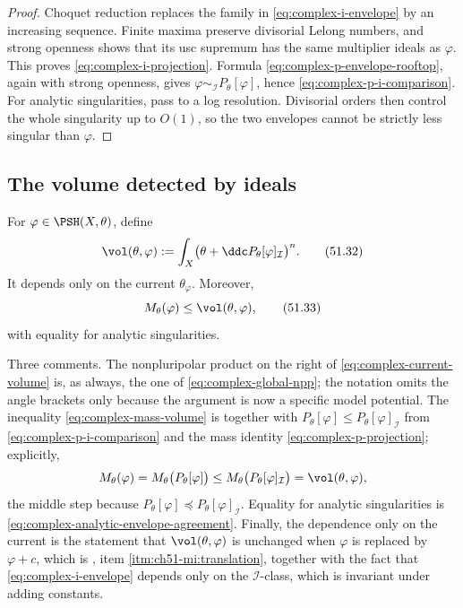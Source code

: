 \begin{proof}
Choquet reduction replaces the family in
\eqref{eq:complex-i-envelope} by an increasing sequence.  Finite maxima
preserve divisorial Lelong numbers, and strong openness shows that its
usc supremum has the same multiplier ideals as \(\varphi\).  This proves
\eqref{eq:complex-i-projection}.  Formula
\eqref{eq:complex-p-envelope-rooftop}, again with strong openness, gives
\(\varphi\sim_{\mathcal I}P_\theta[\varphi]\), hence
\eqref{eq:complex-p-i-comparison}.  For analytic singularities, pass to
a log resolution.  Divisorial orders then control the whole singularity
up to \(O(1)\), so the two envelopes cannot be strictly less singular
than \(\varphi\).
\end{proof}

\subsection{The volume detected by ideals}
\label{sec:ch51-current-volume}

\begin{definition}
\label{def:complex-current-volume}
For \(\varphi\in\PSH(X,\theta)\), define
\[
 \vol(\theta,\varphi)
 :=\int_X\bigl(\theta+\ddc
             P_\theta[\varphi]_{\mathcal I}\bigr)^n.
\tag{51.32}\label{eq:complex-current-volume}
\]
It depends only on the current \(\theta_\varphi\).  Moreover,
\[
 M_\theta(\varphi)\leq\vol(\theta,\varphi),
\tag{51.33}\label{eq:complex-mass-volume}
\]
with equality for analytic singularities.
\end{definition}

Three comments.  The nonpluripolar product on the right of
\eqref{eq:complex-current-volume} is, as always, the one of
\eqref{eq:complex-global-npp}; the notation omits the angle brackets only
because the argument is now a specific model potential.  The inequality
\eqref{eq:complex-mass-volume} is
 together with
\(P_\theta[\varphi]\leq P_\theta[\varphi]_{\mathcal I}\) from
\eqref{eq:complex-p-i-comparison} and the mass identity
\eqref{eq:complex-p-projection}; explicitly,
\[
 M_\theta(\varphi)
 =M_\theta\bigl(P_\theta[\varphi]\bigr)
 \leq M_\theta\bigl(P_\theta[\varphi]_{\mathcal I}\bigr)
 =\vol(\theta,\varphi),
\]
the middle step because \(P_\theta[\varphi]\preceq
P_\theta[\varphi]_{\mathcal I}\).  Equality for analytic singularities is
\eqref{eq:complex-analytic-envelope-agreement}.  Finally, the dependence
only on the current is the statement that
\(\vol(\theta,\varphi)\) is unchanged when \(\varphi\) is replaced by
\(\varphi+c\), which is
, item
\cref{itm:ch51-mi:translation}, together with the fact that
\eqref{eq:complex-i-envelope} depends only on the
\(\mathcal I\)-class, which is invariant under adding constants.

